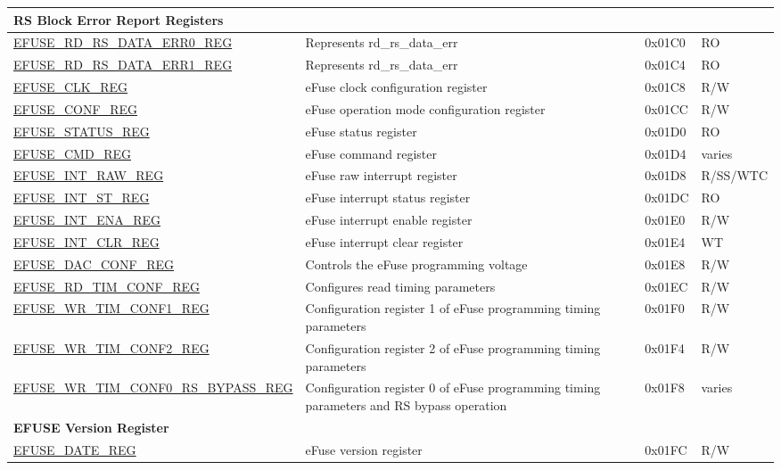\begin{longtable}{ | p{7cm} | p{6cm} | p{1.2cm} | p{1.5cm} | }
\multicolumn{4}{|l|}{\textbf{RS Block Error Report Registers}} \\ \hline
\hyperref[regdesc:EFUSERDRSDATAERR0REG]{EFUSE\_RD\_RS\_DATA\_ERR0\_REG} & Represents rd\_rs\_data\_err & 0x01C0 & RO \\ \hline
\hyperref[regdesc:EFUSERDRSDATAERR1REG]{EFUSE\_RD\_RS\_DATA\_ERR1\_REG} & Represents rd\_rs\_data\_err & 0x01C4 & RO \\ \hline
\hyperref[regdesc:EFUSECLKREG]{EFUSE\_CLK\_REG} & eFuse clock configuration register & 0x01C8 & R/W \\ \hline
\hyperref[regdesc:EFUSECONFREG]{EFUSE\_CONF\_REG} & eFuse operation mode configuration register & 0x01CC & R/W \\ \hline
\hyperref[regdesc:EFUSESTATUSREG]{EFUSE\_STATUS\_REG} & eFuse status register & 0x01D0 & RO \\ \hline
\hyperref[regdesc:EFUSECMDREG]{EFUSE\_CMD\_REG} & eFuse command register & 0x01D4 & varies \\ \hline
\hyperref[regdesc:EFUSEINTRAWREG]{EFUSE\_INT\_RAW\_REG} & eFuse raw interrupt register & 0x01D8 & R/SS/WTC \\ \hline
\hyperref[regdesc:EFUSEINTSTREG]{EFUSE\_INT\_ST\_REG} & eFuse interrupt status register & 0x01DC & RO \\ \hline
\hyperref[regdesc:EFUSEINTENAREG]{EFUSE\_INT\_ENA\_REG} & eFuse interrupt enable register & 0x01E0 & R/W \\ \hline
\hyperref[regdesc:EFUSEINTCLRREG]{EFUSE\_INT\_CLR\_REG} & eFuse interrupt clear register & 0x01E4 & WT \\ \hline
\hyperref[regdesc:EFUSEDACCONFREG]{EFUSE\_DAC\_CONF\_REG} & Controls the eFuse programming voltage & 0x01E8 & R/W \\ \hline
\hyperref[regdesc:EFUSERDTIMCONFREG]{EFUSE\_RD\_TIM\_CONF\_REG} & Configures read timing parameters & 0x01EC & R/W \\ \hline
\hyperref[regdesc:EFUSEWRTIMCONF1REG]{EFUSE\_WR\_TIM\_CONF1\_REG} & Configuration register 1 of eFuse programming timing parameters & 0x01F0 & R/W \\ \hline
\hyperref[regdesc:EFUSEWRTIMCONF2REG]{EFUSE\_WR\_TIM\_CONF2\_REG} & Configuration register 2 of eFuse programming timing parameters & 0x01F4 & R/W \\ \hline
\hyperref[regdesc:EFUSEWRTIMCONF0RSBYPASSREG]{EFUSE\_WR\_TIM\_CONF0\_RS\_BYPASS\_REG} & Configuration register 0 of eFuse programming timing parameters and RS bypass operation & 0x01F8 & varies \\ \hline
\multicolumn{4}{|l|}{\textbf{EFUSE Version Register}} \\ \hline
\hyperref[regdesc:EFUSEDATEREG]{EFUSE\_DATE\_REG} & eFuse version register & 0x01FC & R/W \\ \hline
\end{longtable}
